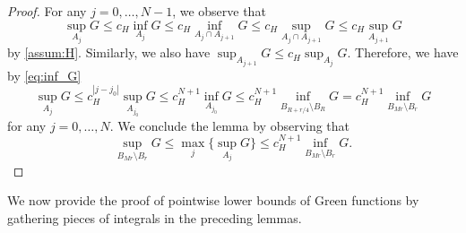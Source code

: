 \documentclass[reqno]{amsart}
\theoremstyle{plain}
\theoremstyle{definition}
\numberwithin{equation}{section}
\begin{document}
\begin{proof}
For any $j = 0, \dots, N-1$, we observe that
\begin{equation*}
\sup_{A_j} G \leq c_H \inf_{A_j} G \leq c_H \inf_{A_j \cap A_{j+1}} G \leq c_H \sup_{A_j \cap A_{j+1}} G \leq c_H \sup_{A_{j+1}} G
\end{equation*}
by \eqref{assum:H}. Similarly, we also have $\sup_{A_{j+1}} G \leq c_H \sup_{A_j}G$.
Therefore, we have by \eqref{eq:inf_G}
\begin{equation*}
\sup_{A_j} G \leq c_H^{|j-j_0|} \sup_{A_{j_0}} G \leq c_H^{N+1} \inf_{A_{j_0}} G \leq c_H^{N+1} \inf_{B_{R+r/4} \setminus B_{R}} G = c_H^{N+1} \inf_{B_{Mr} \setminus B_r} G
\end{equation*}
for any $j=0,\dots, N$. We conclude the lemma by observing that
\begin{equation*}
\sup_{B_{Mr} \setminus B_r} G \leq \max_j \bigg\lbrace \sup_{A_j} G \bigg\rbrace \leq c_H^{N+1} \inf_{B_{Mr} \setminus B_r} G.
\end{equation*}
\end{proof}


We now provide the proof of pointwise lower bounds of Green functions 
by gathering pieces of integrals in the preceding lemmas.
\end{document}
